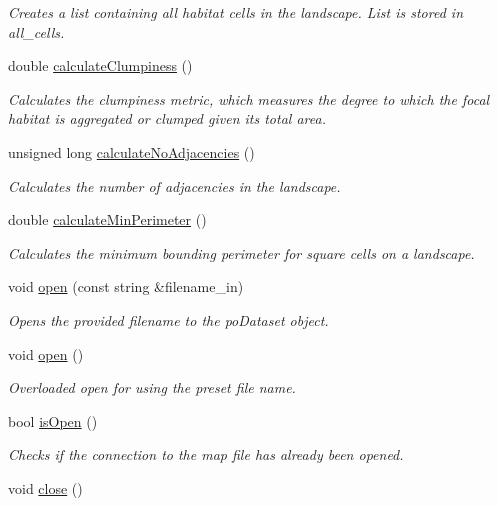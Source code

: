 \begin{DoxyCompactItemize}
\begin{DoxyCompactList}\small\item\em Creates a list containing all habitat cells in the landscape. List is stored in all\+\_\+cells. \end{DoxyCompactList}\item 
double \hyperlink{class_landscape_metrics_calculator_aff48704d3a9e02da4914ac2b08c5f79b}{calculate\+Clumpiness} ()
\begin{DoxyCompactList}\small\item\em Calculates the clumpiness metric, which measures the degree to which the focal habitat is aggregated or clumped given its total area. \end{DoxyCompactList}\item 
unsigned long \hyperlink{class_landscape_metrics_calculator_ae477e368c4f13042cf2f9a47e62d60ae}{calculate\+No\+Adjacencies} ()
\begin{DoxyCompactList}\small\item\em Calculates the number of adjacencies in the landscape. \end{DoxyCompactList}\item 
double \hyperlink{class_landscape_metrics_calculator_a1ba606d6fb687aceaf4a8e31e8f17273}{calculate\+Min\+Perimeter} ()
\begin{DoxyCompactList}\small\item\em Calculates the minimum bounding perimeter for square cells on a landscape. \end{DoxyCompactList}\item 
void \hyperlink{class_map_aa2764c9ae1c54c1821fa4f63b88fe0f3}{open} (const string \&filename\+\_\+in)
\begin{DoxyCompactList}\small\item\em Opens the provided filename to the po\+Dataset object. \end{DoxyCompactList}\item 
void \hyperlink{class_map_a2389e09950706ef49640976837186c79}{open} ()\hypertarget{class_map_a2389e09950706ef49640976837186c79}{}\label{class_map_a2389e09950706ef49640976837186c79}

\begin{DoxyCompactList}\small\item\em Overloaded open for using the preset file name. \end{DoxyCompactList}\item 
bool \hyperlink{class_map_a19f6874b008fcbfac213341d05c2f443}{is\+Open} ()
\begin{DoxyCompactList}\small\item\em Checks if the connection to the map file has already been opened. \end{DoxyCompactList}\item 
void \hyperlink{class_map_ad73fafd17ff95872e9b63945584ae81f}{close} ()\hypertarget{class_map_ad73fafd17ff95872e9b63945584ae81f}{}\label{class_map_ad73fafd17ff95872e9b63945584ae81f}


\end{DoxyCompactItemize}
